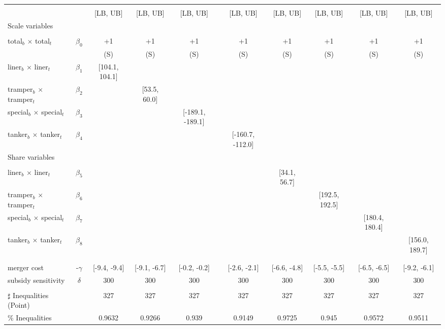 \begin{tabular}{@{\extracolsep{5pt}}lccccccccc}
\toprule 
 &  &  &  &  &  &  &  &  &  \\
 &  & [LB, UB] & [LB, UB] & [LB, UB] & [LB, UB] & [LB, UB] & [LB, UB] & [LB, UB] & [LB, UB] \\
\midrule 
Scale variables &  &  &  &  &  &  &  \\
 &  &  &  &  &  &  &  &  \\
total$_{b}$ $\times$ total$_{t}$ & $\beta_0$ & +1 & +1 & +1 & +1 & +1 & +1 & +1 & +1 \\
 &  & (S) & (S) & (S) & (S) & (S) & (S) & (S) & (S) \\
liner$_{b}$ $\times$ liner$_{t}$ & $\beta_1$ & [104.1, 104.1] &  &  &  &  &  &  &  \\
tramper$_{b}$ $\times$ tramper$_{t}$ & $\beta_2$ &  & [53.5, 60.0] &  &  &  &  &  &  \\
special$_{b}$ $\times$ special$_{t}$ & $\beta_3$ &  &  & [-189.1, -189.1] &  &  &  &  &  \\
tanker$_{b}$ $\times$ tanker$_{t}$ & $\beta_4$ &  &  &  & [-160.7, -112.0] &  &  &  &  \\
Share variables &  &  &  &  &  &  &  &  &  \\
 &  &  &  &  &  &  &  &  &  \\
liner$_{b}$ $\times$ liner$_{t}$ & $\beta_5$ &  &  &  &  & [34.1, 56.7] &  &  &  \\
tramper$_{b}$ $\times$ tramper$_{t}$ & $\beta_6$ &  &  &  &  &  & [192.5, 192.5] &  &  \\
special$_{b}$ $\times$ special$_{t}$ & $\beta_7$ &  &  &  &  &  &  & [180.4, 180.4] &  \\
tanker$_{b}$ $\times$ tanker$_{t}$ & $\beta_8$ &  &  &  &  &  &  &  & [156.0, 189.7] \\
 &  &  &  &  &  &  &  &  &  \\
 &  &  &  &  &  &  &  &  &  \\
merger cost & -$\gamma$ & [-9.4, -9.4] & [-9.1, -6.7] & [-0.2, -0.2] & [-2.6, -2.1] & [-6.6, -4.8] & [-5.5, -5.5] & [-6.5, -6.5] & [-9.2, -6.1] \\
subsidy sensitivity & $\delta$ & 300 & 300 & 300 & 300 & 300 & 300 & 300 & 300 \\
 &  &  &  &  &  &  &  &  &  \\
\hline 
$\sharp$ Inequalities (Point) &  & 327 & 327 & 327 & 327 & 327 & 327 & 327 & 327 \\
\% Inequalities &  & 0.9632 & 0.9266 & 0.939 & 0.9149 & 0.9725 & 0.945 & 0.9572 & 0.9511 \\
\bottomrule 
\end{tabular}
